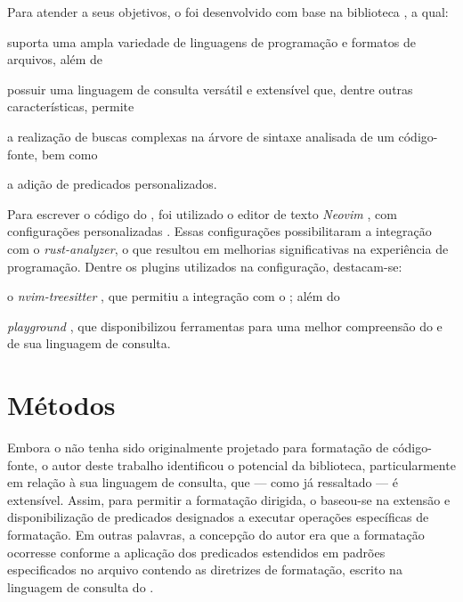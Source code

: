 \documentclass
  [11pt,a4paper,english,brazil,openright,sumario=tradicional,twoside]
  {abntex2}
\begin{document}
  Para atender a seus objetivos, o \witchcooking foi desenvolvido com base na
  biblioteca \treesitter \cite{tree-sitter-2023-tree}, a qual:
  \begin{inparaenum}
    \item suporta uma ampla variedade de linguagens de programação e formatos
          de arquivos, além de
    \item possuir uma linguagem de consulta versátil e extensível que, dentre
          outras características, permite
          \begin{inparaenum}
            \item a realização de buscas complexas na árvore de sintaxe
                  analisada de um código-fonte, bem como
            \item a adição de predicados personalizados.
          \end{inparaenum}
  \end{inparaenum}

  Para escrever o código do \witchcooking, foi utilizado o editor de texto
  \textit{Neovim} \cite{neovim-2023-hyperextensible}, com configurações
  personalizadas \cite{silva-2023-uma}. Essas configurações possibilitaram a
  integração com o \textit{rust-analyzer}, o que resultou em melhorias
  significativas na experiência de programação. Dentre os plugins utilizados na
  configuração, destacam-se:
  \begin{inparaenum}
    \item o \textit{nvim-treesitter} \cite{nvim-treesitter-2023-nvim}, que
          permitiu a integração com o \treesitter; além do
    \item \textit{playground} \cite{nvim-treesitter-2023-playground}, que
          disponibilizou ferramentas para uma melhor compreensão do \treesitter
          e de sua linguagem de consulta.
  \end{inparaenum}


  \section{Métodos}

  Embora o \treesitter não tenha sido originalmente projetado para formatação
  de código-fonte, o autor deste trabalho identificou o potencial da
  biblioteca, particularmente em relação à sua linguagem de consulta, que ---
  como já ressaltado --- é extensível. Assim, para permitir a formatação
  dirigida, o \witchcooking baseou-se na extensão e disponibilização de
  predicados designados a executar operações específicas de formatação. Em
  outras palavras, a concepção do autor era que a formatação ocorresse conforme
  a aplicação dos predicados estendidos em padrões especificados no arquivo
  contendo as diretrizes de formatação, escrito na linguagem de consulta do
  \treesitter.
\end{document}

